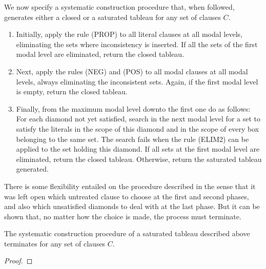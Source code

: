 We now specify a systematic construction procedure that, when followed,
generates either a closed or a saturated tableau for any set of clauses
$C$.

\begin{enumerate}
    \item Initially, apply the rule (PROP) to all literal clauses at all modal
        levels, eliminating the sets where inconsistency is inserted. If all the
        sets of the first modal level are eliminated, return the closed tableau.
    \item Next, apply the rules (NEG) and (POS) to all modal clauses at all modal
        levels, always eliminating the inconsistent sets. Again, if the first
        modal level is empty, return the closed tableau.
    \item Finally, from the maximum modal level downto the first one do as
        follows: For each diamond not yet satisfied, search in the next modal
        level for a set to satisfy the literals in the scope of this diamond and
        in the scope of every box belonging to the same set. The search fails
        when the rule (ELIM2) can be applied to the set holding this diamond.
        If all sets at the first modal level are eliminated, return the closed
        tableau. Otherwise, return the saturated tableau generated.
\end{enumerate}

There is some flexibility entailed on the procedure described in the sense that
it was left open which untreated clause to choose at the first and second
phases, and also which unsatisfied diamonds to deal with at the last phase. But
it can be shown that, no matter how the choice is made, the process must
terminate.

\begin{lemma}
    The systematic construction procedure of a saturated tableau described above
    terminates for any set of clauses $C$.
\end{lemma}
\begin{proof}
\end{proof}

